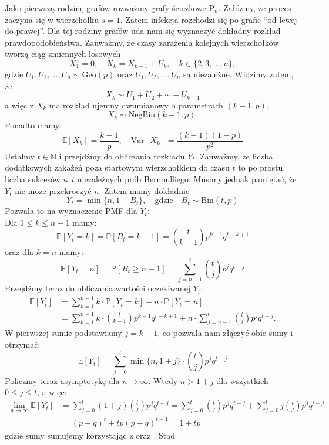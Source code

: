 Jako pierwszą rodzinę grafów rozważmy grafy ścieżkowe $\mathrm{P}_n$. Załóżmy, że proces zaczyna się w wierzchołku $s=1$. Zatem infekcja rozchodzi się po grafie ``od lewej do prawej''. Dla tej rodziny grafów uda nam się wyznaczyć dokładny rozkład prawdopodobieństwa. Zauważmy, że czasy zarażenia kolejnych wierzchołków tworzą ciąg zmiennych losowych
\[
X_1 = 0, \quad X_{k} = X_{k-1} + U_k, \quad k\in\{2,3,\dots,n\},
\]
gdzie $U_1,U_2,\dots,U_n \sim \mathrm{Geo}(p)$ oraz $U_1,U_2,\dots,U_n$ są niezależne. 
Widzimy zatem, że
\[
X_k \sim U_1 + U_2 + \cdots + U_{k-1}
\]
a więc z  $X_k$ ma rozkład ujemny dwumianowy o parametrach $(k-1, p)$, 
\[
X_k\sim \mathrm{NegBin}(k-1, p).
\]
Ponadto mamy:
\[
    \mathbb{E}[X_k] = \frac{k-1}{p}, \quad \mathrm{Var}[X_k] = \frac{(k-1)(1-p)}{p^2}
\]
Ustalmy $t\in\mathbb{N}$ i przejdźmy do obliczania rozkładu $Y_t$. Zauważmy, że liczba dodatkowych zakażeń poza startowym wierzchołkiem do czasu $t$ to po prostu liczba sukcesów w $t$ niezależnych prób Bernoulliego. Musimy jednak pamiętać, że $Y_t$ nie może przekroczyć $n$. Zatem mamy dokładnie
\[
Y_t = \min\{n, 1 + B_t\}, \quad \text{gdzie} \quad B_t \sim \mathrm{Bin}(t,p)
\]
Pozwala to na wyznaczenie PMF dla $Y_t$: \\
Dla $1 \le k \le n-1$ mamy:
\[
\mathbb{P}[Y_t=k] = \mathbb{P}[B_t=k-1] = \binom{t}{k-1} p^{k-1} q^{t-k+1}
\]  
oraz dla $k = n$ mamy:
\[
\mathbb{P}[Y_t=n] = \mathbb{P}[B_t \ge n-1] = \sum_{j=n-1}^{t} \binom{t}{j} p^j q^{t-j}
\]
Przejdźmy teraz do obliczania wartości oczekiwanej $Y_t$:
\begin{align*}
\mathbb{E}[Y_t] 
&= \sum_{k=1}^{n-1} k \cdot \mathbb{P}[Y_t=k] + n \cdot \mathbb{P}[Y_t=n] \\
&= \sum_{k=1}^{n-1} k \cdot \binom{t}{k-1} p^{k-1} q^{t-k+1} 
   + n \cdot \sum_{j=n-1}^{t} \binom{t}{j} p^j q^{t-j}.
\end{align*}
W pierwszej sumie podstawiamy $j = k-1$, co pozwala nam złączyć obie sumy i otrzymać:
\[
    \mathbb{E}[Y_t] = \sum_{j=0}^{t} \min\{n, 1+j\} \cdot \binom{t}{j} p^j q^{t-j}
\]
Policzmy teraz asymptotykę dla $n \to \infty$. Wtedy $n > 1 + j$ dla wszystkich $0 \le j \le t$, a więc:
\begin{align*}
\lim_{n \to \infty} \mathbb{E}[Y_t] 
    &= \sum_{j=0}^{t} (1+j)\binom{t}{j} p^j q^{t-j} = \sum_{j=0}^{t} \binom{t}{j} p^j q^{t-j} 
       + \sum_{j=0}^{t} j \binom{t}{j} p^j q^{t-j} \\
    &= (p+q)^t + t p (p+q)^{t-1} = 1 + t p 
\end{align*}
gdzie sumy sumujemy korzystając z  oraz . Stąd
